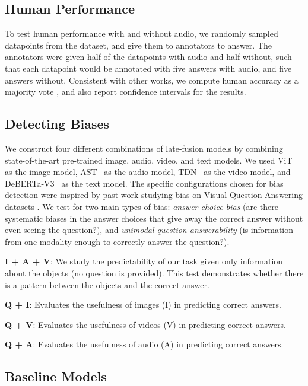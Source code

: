 \documentclass[runningheads]{llncs}
\begin{document}
\subsection{Human Performance} \label{sec:human}


To test human performance with and without audio, we randomly sampled  datapoints from the dataset, and give them to  annotators to answer. The annotators were given half of the datapoints with audio and half without, such that each datapoint would be annotated with five answers with audio, and five answers without. Consistent with other works, we compute human accuracy as a majority vote \cite{bisk2020piqa,zellers2019vcr}, and also report  confidence intervals for the results.

\subsection{Detecting Biases} \label{sec:bias}


We construct four different combinations of late-fusion models by combining state-of-the-art pre-trained image, audio, video, and text models. We used ViT~\cite{dosovitskiy2020vit} as the image model, AST~\cite{gong2021ast} as the audio model, TDN~\cite{wang2021tdn} as the video model, and DeBERTa-V3~\cite{he2021debertav3,he2021deberta} as the text model. The specific configurations chosen for bias detection were inspired by past work studying bias on Visual Question Answering datasets \cite{cadene2019rubi,yang2020gives,zellers2019vcr}. We test for two main types of bias: \textit{answer choice bias} (are there systematic biases in the answer choices that give away the correct answer without even seeing the question?), and \textit{unimodal question-answerability} (is information from one modality enough to correctly answer the question?).

\noindent\textbf{I + A + V}: We study the predictability of our task given only information about the objects (no question is provided). This test demonstrates whether there is a pattern between the objects and the correct answer.

\noindent\textbf{Q + I}: Evaluates the usefulness of images (I) in predicting correct answers.

\noindent\textbf{Q + V}: Evaluates the usefulness of videos (V) in predicting correct answers.

\noindent\textbf{Q + A}: Evaluates the usefulness of audio (A) in predicting correct answers.

\subsection{Baseline Models} \label{sec:models}
\end{document}
